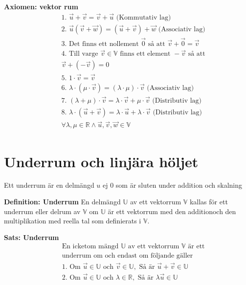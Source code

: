 \begin{multicols}{2}
\textbf{Axiomen: vektor rum}
\begin{align*}
  &\quad  \text{1. } \vec{u}+\vec{v} = \vec{v}+\vec{u} \text{ (Kommutativ lag)} \\
  &\quad  \text{2. } \vec{u}(\vec{v}+\vec{w}) = (\vec{u}+\vec{v})+\vec{w} \text{ (Associativ lag)} \\
  &\quad  \text{3. } \text{Det finns ett nollement } \vec{0} \text{ så att }
  \vec{v}+\vec{0}=\vec{v} \\
  &\quad  \text{4. } \text{Till varge } \vec{v}\in\mathbb{V} \text{ finns ett element }
  -\vec{v} \text{ så att} \\
  &\quad  \vec{v}+(-\vec{v}) = 0 \\
  &\quad  \text{5. } 1\cdot\vec{v} = \vec{v} \\
  &\quad  \text{6. } \lambda\cdot(\mu\cdot\vec{v}) = (\lambda\cdot\mu)\cdot\vec{v}
  \text{ (Associativ lag)} \\
  &\quad  \text{7. } (\lambda+\mu)\cdot\vec{v} = \lambda\cdot\vec{v} + \mu\cdot\vec{v}
  \text{ (Distributiv lag)} \\
  &\quad  \text{8. } \lambda\cdot(\vec{u}+\vec{v}) = \lambda\cdot\vec{u} + \lambda\cdot\vec{v}
  \text{ (Distributiv lag)} \\
  &\quad  \forall\lambda,\mu\in\mathbb{R}\land\vec{u},\vec{v},\vec{w}\in\mathbb{V} \\
\end{align*}


\newpage

\section{Underrum och linjära höljet}
Ett underrum är en delmängd $u$ ej $0$ som är sluten under addition och skalning

\textbf{Definition: Underrum}
En delmängd $\mathbb{U}$ av ett vektorrum $\mathbb{V}$ kallas för
ett underrum eller delrum av $\mathbb{V}$ om $\mathbb{U}$ är ett vektorrum
med den additionoch den multiplikation med reella tal som definierats i
$\mathbb{V}$.

\textbf{Sats: Underrum}
\begin{align*}
  &\quad  \text{En icketom mängd $\mathbb{U}$ av ett vektorrum $\mathbb{V}$ är ett} \\
  &\quad  \text{underrum om och endast om följande gäller} \\
  &\quad  \text{1. Om } \vec{u}\in\mathbb{U} \text{ och } \vec{v}\in\mathbb{U},
  \text{ Så är } \vec{u}+\vec{v} \in\mathbb{U} \\
  &\quad  \text{2. Om } \vec{u}\in\mathbb{U} \text{ och } \lambda\in\mathbb{R},
  \text{ Så är } \lambda\vec{u} \in\mathbb{U} \\
\end{align*}


\end{multicols}
